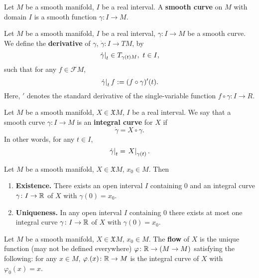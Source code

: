 \begin{definition}
  Let $M$ be a smooth manifold, $I$ be a real interval.
  A \textbf{smooth curve} on $M$ with domain $I$ is a smooth function
  $\gamma \colon I \to M$.
\end{definition}
\begin{definition}
  Let
    $M$ be a smooth manifold,
    $I$ be a real interval,
    $\gamma \colon I \to M$ be a smooth curve.
  We define the \textbf{derivative} of $\gamma$,
  $\dot{\gamma} \colon I \to T M$, by
  \begin{equation}
    \left. \dot{\gamma} \right|_{t} \in T_{\gamma(t) M},\ t \in I,
  \end{equation}
  such that for any $f \in \mathcal{F} M$,
  \begin{equation}
    \left. \dot{\gamma} \right|_{t} f := (f \circ \gamma)'(t).
  \end{equation}
  Here, $'$ denotes the standard derivative of the single-variable function
  $f \circ \gamma \colon I \to R$.
\end{definition}
\begin{definition}
  Let $M$ be a smooth manifold, $X \in \mathfrak{X} M$, $I$ be a real interval.
  We say that a smooth curve $\gamma \colon I \to M$ is an
  \textbf{integral curve} for $X$ if
  \begin{equation}
    \dot{\gamma} = X \circ \gamma.
  \end{equation}
  In other words, for any $t \in I$,
  \begin{equation}
    \left. \dot{\gamma} \right|_{t} = \left. X \right|_{\gamma(t)}.
  \end{equation}
\end{definition}
\begin{proposition}
  Let $M$ be a smooth manifold, $X \in \mathfrak{X} M$, $x_0 \in M$.
  Then
  \begin{enumerate}
    \item
      \textbf{Existence.}
      There exists an open interval $I$ containing $0$ and an integral curve
      $\gamma \colon I \to \mathbb{R}$ of $X$ with $\gamma(0) = x_0$.
    \item
      \textbf{Uniqueness.}
      In any open interval $I$ containing $0$ there exists at most one integral
      curve $\gamma \colon I \to \mathbb{R}$ of $X$ with $\gamma(0) = x_0$.
  \end{enumerate}
\end{proposition}
\begin{definition}
  Let $M$ be a smooth manifold, $X \in \mathfrak{X} M$, $x_0 \in M$.
  The \textbf{flow} of $X$ is the unique function
  (may not be defined everywhere)
  $\varphi \colon \mathbb{R} \to (M \to M)$
  satisfying the following: for any $x \in M$, 
  $\varphi_{\cdot}(x) \colon \mathbb{R} \to M$ is the integral curve of $X$ with
  $\varphi_0(x) = x$.
\end{definition}
